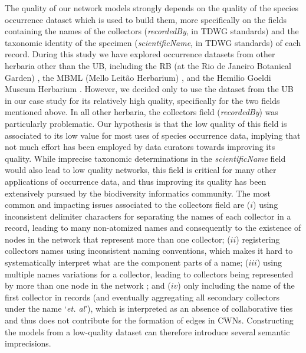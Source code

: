 The quality of our network models strongly depends on the quality of the species occurrence dataset which is used to build them, more specifically on the fields containing the names of the collectors (\textit{recordedBy}, in TDWG standards) and the taxonomic identity of the specimen (\textit{scientificName}, in TDWG standards) of each record.
%
During this study we have explored occurrence datasets from other herbaria other than the UB, including
the RB (at the Rio de Janeiro Botanical Garden) \cite{gbif_rb}, 
the MBML (Mello Leitão Herbarium) \cite{gbif_mbml},
and the Hemilio Goeldi Museum Herbarium \cite{gbif_mpegh}.
However, we decided only to use the dataset from the UB in our case study for its relatively high quality, specifically for the two fields mentioned above.
%
In all other herbaria, the collectors field (\textit{recordedBy}) was particularly problematic.
Our hypothesis is that the low quality of this field is associated to its low value for most uses of species occurrence data, implying that not much effort has been employed by data curators towards improving its quality.
While imprecise taxonomic determinations in the \textit{scientificName} field would also lead to low quality networks, this field is critical for many other applications of occurrence data, and thus improving its quality has been extensively pursued by the biodiversity informatics community.
The most common and impacting issues associated to the collectors field are 
($i$) using inconsistent delimiter characters for separating the names of each collector in a record, leading to many non-atomized names and consequently to the existence of nodes in the network that represent more than one collector; 
($ii$) registering collectors names using inconsistent naming conventions, which makes it hard to systematically interpret what are the component parts of a name; 
($iii$) using multiple names variations for a collector, leading to collectors being represented by more than one node in the network ; and 
($iv$) only including the name of the first collector in records (and eventually aggregating all secondary collectors under the name `\textit{et. al}'), which is interpreted as an absence of collaborative ties and thus does not contribute for the formation of edges in CWNs.
Constructing the models from a low-quality dataset can therefore introduce several semantic imprecisions. 


